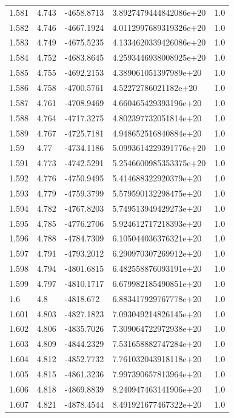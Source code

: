 \begin{tabular}{lllll}
1.581 & 4.743 & -4658.8713 & 3.8927479444842086e+20 & 1.0 \\
1.582 & 4.746 & -4667.1924 & 4.0112997689319326e+20 & 1.0 \\
1.583 & 4.749 & -4675.5235 & 4.1334620339426086e+20 & 1.0 \\
1.584 & 4.752 & -4683.8645 & 4.2593446938008925e+20 & 1.0 \\
1.585 & 4.755 & -4692.2153 & 4.389061051397989e+20 & 1.0 \\
1.586 & 4.758 & -4700.5761 & 4.52272786021182e+20 & 1.0 \\
1.587 & 4.761 & -4708.9469 & 4.660465429393196e+20 & 1.0 \\
1.588 & 4.764 & -4717.3275 & 4.802397732051814e+20 & 1.0 \\
1.589 & 4.767 & -4725.7181 & 4.948652516840884e+20 & 1.0 \\
1.59 & 4.77 & -4734.1186 & 5.0993614229391776e+20 & 1.0 \\
1.591 & 4.773 & -4742.5291 & 5.2546600985353375e+20 & 1.0 \\
1.592 & 4.776 & -4750.9495 & 5.414688322920379e+20 & 1.0 \\
1.593 & 4.779 & -4759.3799 & 5.579590132298475e+20 & 1.0 \\
1.594 & 4.782 & -4767.8203 & 5.749513949429273e+20 & 1.0 \\
1.595 & 4.785 & -4776.2706 & 5.924612717218393e+20 & 1.0 \\
1.596 & 4.788 & -4784.7309 & 6.105044036376321e+20 & 1.0 \\
1.597 & 4.791 & -4793.2012 & 6.290970307269912e+20 & 1.0 \\
1.598 & 4.794 & -4801.6815 & 6.482558876093191e+20 & 1.0 \\
1.599 & 4.797 & -4810.1717 & 6.679982185490851e+20 & 1.0 \\
1.6 & 4.8 & -4818.672 & 6.883417929767778e+20 & 1.0 \\
1.601 & 4.803 & -4827.1823 & 7.093049214826145e+20 & 1.0 \\
1.602 & 4.806 & -4835.7026 & 7.309064722972938e+20 & 1.0 \\
1.603 & 4.809 & -4844.2329 & 7.531658882747284e+20 & 1.0 \\
1.604 & 4.812 & -4852.7732 & 7.761032043918118e+20 & 1.0 \\
1.605 & 4.815 & -4861.3236 & 7.997390657813964e+20 & 1.0 \\
1.606 & 4.818 & -4869.8839 & 8.240947463141906e+20 & 1.0 \\
1.607 & 4.821 & -4878.4544 & 8.491921677467322e+20 & 1.0 \\

\end{tabular}

